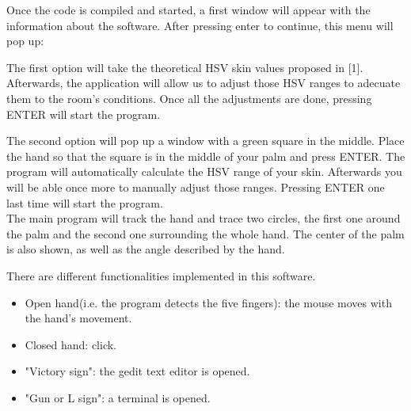 \documentclass{article}
\begin{document}
Once the code is compiled and started, a first window will appear with the information about the software. After pressing enter to continue, this menu will pop up: 
\begin{center}
\end{center}

\vspace{1cm}
The first option will take the theoretical HSV skin values proposed in [1]. Afterwards, the application will allow us to adjust those HSV ranges to adecuate them to the room's conditions. 
Once all the adjustments are done, pressing ENTER will start the program. 

The second option will pop up a window with a green square in the middle. Place the hand so that the square is in the middle of your palm and press ENTER. The program will automatically calculate the HSV range of your skin. Afterwards you will be able once more to manually adjust those ranges. Pressing ENTER one last time will start the program. 
\\
 
The main program will track the hand and trace two circles, the first one around the palm and the second one surrounding the whole hand. The center of the palm is also shown, as well as the angle described by the hand. 

There are different functionalities implemented in this software. 
\begin{itemize}
\item Open hand(i.e. the program detects the five fingers): the mouse moves with the hand's movement.
\item Closed hand: click.
\item "Victory sign": the gedit text editor is opened.
\item "Gun or L sign": a terminal is opened. 
\end{itemize}
\end{document}
